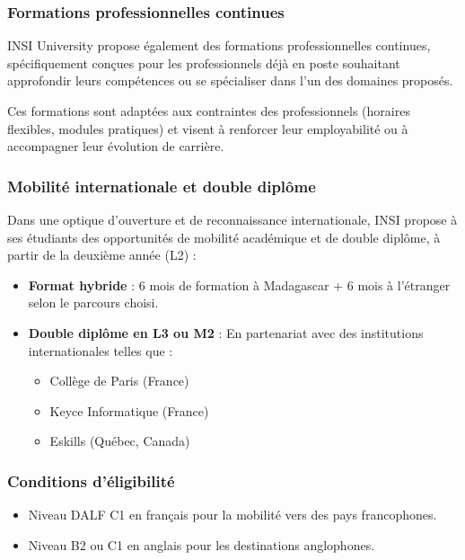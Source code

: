 \documentclass[a4paper,12pt, oneside]{article}
\begin{document}
\subsubsection{Formations professionnelles continues}

INSI University propose également des formations professionnelles continues, spécifiquement conçues pour les professionnels déjà en poste souhaitant approfondir leurs compétences ou se spécialiser dans l’un des domaines proposés.

Ces formations sont adaptées aux contraintes des professionnels (horaires flexibles, modules pratiques) et visent à renforcer leur employabilité ou à accompagner leur évolution de carrière.

\subsubsection{Mobilité internationale et double diplôme}

Dans une optique d’ouverture et de reconnaissance internationale, INSI propose à ses étudiants des opportunités de mobilité académique et de double diplôme, à partir de la deuxième année (L2) :

\begin{itemize}
    \item \textbf{Format hybride} : 6 mois de formation à Madagascar + 6 mois à l’étranger selon le parcours choisi.
    \item \textbf{Double diplôme en L3 ou M2} : En partenariat avec des institutions internationales telles que :
    \begin{itemize}
        \item Collège de Paris (France)
        \item Keyce Informatique (France)
        \item Eskills (Québec, Canada)
    \end{itemize}
\end{itemize}

\subsubsection*{Conditions d’éligibilité}
\begin{itemize}
    \item Niveau DALF C1 en français pour la mobilité vers des pays francophones.
    \item Niveau B2 ou C1 en anglais pour les destinations anglophones.
\end{itemize}
\end{document}
